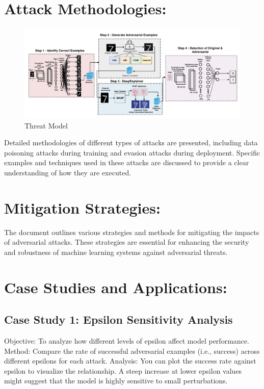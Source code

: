 \documentclass[10pt, conference, a4paper, final]{IEEEtran}
\begin{document}
\section{Attack Methodologies:}
\begin{figure}[!ht]
    \centering
    \includegraphics[width=1\textwidth]{paper_images/conference_model.pdf}
    \caption{Threat Model}
    \label{threat model}
    \end{figure}
Detailed methodologies of different types of attacks are presented, including data poisoning attacks during training and evasion attacks during deployment. Specific examples and techniques used in these attacks are discussed to provide a clear understanding of how they are executed.
\section{Mitigation Strategies:}

The document outlines various strategies and methods for mitigating the impacts of adversarial attacks. These strategies are essential for enhancing the security and robustness of machine learning systems against adversarial threats.
\section{Case Studies and Applications:}

\subsection{Case Study 1: Epsilon Sensitivity Analysis}
Objective: To analyze how different levels of epsilon affect model performance.
Method: Compare the rate of successful adversarial examples (i.e., success) across different epsilons for each attack.
Analysis: You can plot the success rate against epsilon to visualize the relationship. A steep increase at lower epsilon values might suggest that the model is highly sensitive to small perturbations.
\end{document}
